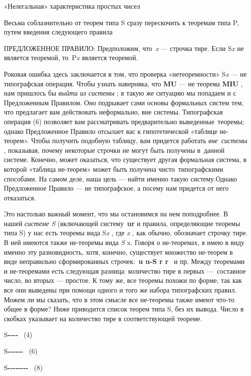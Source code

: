 «Нелегальная» характеристика простых чисел

Весьма соблазнительно от теорем типа S сразу перескочить к теоремам типа P, путем введения следующего правила

ПРЕДЛОЖЕННОЕ ПРАВИЛО: Предположим, что~\emph{x} --- строчка тире. Если S\emph{x} не является теоремой, то~P\emph{x} является теоремой.

Роковая ошибка здесь заключается в том, что проверка «нетеоремности» S\emph{x} --- не типографская операция. Чтобы узнать наверняка, что \textbf{MU} --- не теорема \textbf{MIU} , нам пришлось бы \emph{выйти из системы} ; в такую же ситуацию мы попадаем и с Предложенным Правилом. Оно подрывает сами основы формальных систем тем, что предлагает вам действовать неформально, вне системы. Типографская операция (6) позволяет вам рассматривать предварительно выведенные~теоремы; однако Предложенное Правило отсылает вас к гипотетической «таблице не-теорем». Чтобы получить подобную таблицу, вам придется работать \emph{вне~системы} , показывая, почему некоторые строчки не могут быть получены в~данной системе. Конечно, может оказаться, что существует другая формальная система, в которой «таблица не-теорем» может быть получена чисто~типографскими способами. На самом деле, наша цель --- найти именно такую систему.Однако Предложенное Правило --- не типографское, а посему нам придется от него отказаться.

Это настолько важный момент, что мы остановимся на нем поподробнее. В нашей \emph{системе S} (включающей систему~\textbf{ur} и правила, определяющие теоремы типа S) у нас есть теоремы вида S\emph{x} , где \emph{x} , как обычно, обозначает строчку тире. В ней имеются также не-теоремы вида \emph{S} x. Говоря о не-теоремах, я имею в виду именно эту разновидность, хотя, конечно, существует множество не-теорем в виде неправильно сформированных строчек:~\textbf{u u-S r r} ~и пр. Между теоремами и не-теоремами есть следующая разница: количество тире в первых ---~составное число, во вторых --- простое. К тому же, все теоремы похожи по форме, так как все они выведены при помощи одного и того же набора типографских правил. Можем ли мы сказать, что в этом смысле все не-теоремы также имеют что-то общее в форме? Ниже приводится список теорем типа S, без их вывода. Число в скобках указывает на количество тире в соответствующей теореме.

S\textbf{-\/-\/-\/-} ~(4)

S\textbf{-\/-\/-\/-\/-\/-} ~(6)

S\textbf{-\/-\/-\/-\/-\/-\/-\/-} ~(8)

